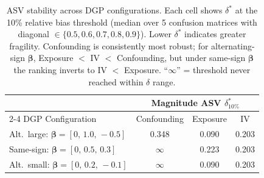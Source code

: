 \begin{table}[t]
\centering
\caption{ASV stability across DGP configurations. Each cell shows $\delta^*$ at the 10\% relative bias threshold (median over 5 confusion matrices with diagonal $\in\{0.5,0.6,0.7,0.8,0.9\}$). Lower $\delta^*$ indicates greater fragility. Confounding is consistently most robust; for alternating-sign $\bm{\beta}$, Exposure $<$ IV $<$ Confounding, but under same-sign $\bm{\beta}$ the ranking inverts to IV $<$ Exposure. ``$\infty$\!\!'' = threshold never reached within $\delta$ range.}
\label{tab:asv_stability}
\small
\begin{tabular}{l ccc}
\toprule
 & \multicolumn{3}{c}{Magnitude ASV $\delta^*_{10\%}$} \\
\cmidrule(lr){2-4}
DGP Configuration & Confounding & Exposure & IV \\
\midrule
Alt.\ large: $\bm{\beta}=[0,\,1.0,\,-0.5]$ & 0.348 & 0.090 & 0.203 \\
Same-sign: $\bm{\beta}=[0,\,0.5,\,0.3]$ & $\infty$ & 0.223 & 0.203 \\
Alt.\ small: $\bm{\beta}=[0,\,0.2,\,-0.1]$ & $\infty$ & 0.090 & 0.203 \\
\bottomrule
\end{tabular}
\end{table}